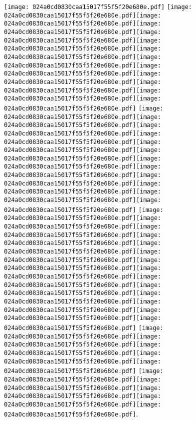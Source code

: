 \documentclass{article}
\newcommand{\origpg}[2]{\texttt{[image: 024a0cd0830caa15017f55f5f20e680e.pdf]}}
\begin{document}
{\vspace{0.626pt}\origpg{11}{85.303pt 566.04pt 92.469pt 582.19pt} \origpg{11}{106.96pt 566.04pt 117.18pt 582.19pt}\hspace{-0.339pt}\origpg{11}{116.84pt 566.04pt 124.01pt 582.19pt}\origpg{11}{124.06pt 566.04pt 131.9pt 582.19pt}\hspace{-0.613pt}\origpg{11}{131.29pt 566.04pt 138.45pt 582.19pt}\origpg{11}{138.5pt 566.04pt 147.14pt 582.19pt}\origpg{11}{147.14pt 566.04pt 157.35pt 582.19pt}\hspace{-0.307pt}\origpg{11}{157.05pt 566.04pt 164.21pt 582.19pt}\hspace{0.291pt}\origpg{11}{164.5pt 566.04pt 172.56pt 582.19pt}\origpg{11}{172.46pt 566.04pt 179.82pt 582.19pt}\hspace{-0.129pt}\origpg{11}{179.69pt 566.04pt 188.33pt 582.19pt}\origpg{11}{188.33pt 566.04pt 196.4pt 582.19pt}\origpg{11}{196.32pt 566.04pt 204.95pt 582.19pt} \origpg{11}{219.19pt 566.04pt 226.8pt 582.19pt}\origpg{11}{226.89pt 566.04pt 234.05pt 582.19pt}\hspace{-0.178pt}\origpg{11}{233.87pt 566.04pt 241.94pt 582.19pt}\origpg{11}{242.04pt 566.04pt 250.11pt 582.19pt}\hspace{-0.597pt}\origpg{11}{249.51pt 566.04pt 256.94pt 582.19pt}\origpg{11}{256.94pt 566.04pt 263.99pt 582.19pt}\origpg{11}{263.99pt 566.04pt 272.63pt 582.19pt}\origpg{11}{272.63pt 566.04pt 280.7pt 582.19pt}\hspace{0.355pt}\origpg{11}{281.05pt 566.04pt 288.22pt 582.19pt}\origpg{11}{288.27pt 566.04pt 295.32pt 582.19pt}\hspace{-0.307pt}\origpg{11}{295.01pt 566.04pt 302.37pt 582.19pt}\origpg{11}{302.47pt 566.04pt 314.53pt 582.19pt} \origpg{11}{328.47pt 566.04pt 336.09pt 582.19pt}\origpg{11}{336.17pt 566.04pt 342.55pt 582.19pt}\hspace{-0.113pt}\origpg{11}{342.43pt 566.04pt 349.6pt 582.19pt}\origpg{11}{349.65pt 566.04pt 358.28pt 582.19pt}\origpg{11}{358.28pt 566.04pt 368.5pt 582.19pt}\origpg{11}{368.44pt 566.04pt 376.51pt 582.19pt}\hspace{-0.597pt}\origpg{11}{375.91pt 566.04pt 384.12pt 582.19pt}\origpg{11}{384.12pt 566.04pt 391.29pt 582.19pt}\hspace{-0.21pt}\origpg{11}{391.08pt 566.04pt 399.72pt 582.19pt}\origpg{11}{399.72pt 566.04pt 406.88pt 582.19pt}\origpg{11}{406.96pt 566.04pt 414.02pt 582.19pt}\origpg{11}{413.95pt 566.04pt 421.57pt 582.19pt}\origpg{11}{421.65pt 566.04pt 430.29pt 582.19pt}\hspace{-0.21pt}\origpg{11}{430.08pt 566.04pt 437.5pt 582.19pt} \origpg{11}{451.98pt 566.04pt 462.19pt 582.19pt}\origpg{11}{462.1pt 566.04pt 469.26pt 582.19pt}\hspace{-0.178pt}\origpg{11}{469.09pt 566.04pt 480.24pt 582.19pt}\origpg{11}{480.18pt 566.04pt 488.39pt 582.19pt}\origpg{11}{488.39pt 566.04pt 496.46pt 582.19pt} \origpg{11}{510.52pt 566.04pt 517.69pt 582.19pt}\origpg{11}{517.73pt 566.04pt 525.8pt 582.19pt}\hspace{-0.113pt}\origpg{11}{525.69pt 566.04pt 533.91pt 582.19pt}\origpg{11}{533.91pt 566.04pt 541.98pt 582.19pt}\hspace{-0.145pt}\origpg{11}{541.83pt 566.04pt 550.47pt 582.19pt}. 

}
\end{document}
